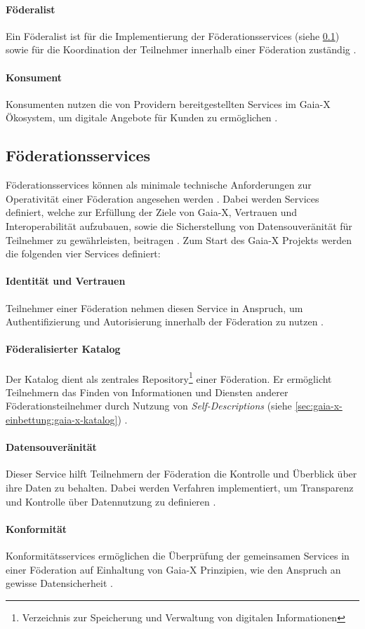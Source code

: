 \paragraph{Föderalist}
Ein Föderalist ist für die Implementierung der Föderationsservices (siehe \ref{subsec:gaia-x:federationservices}) 
sowie für die Koordination der Teilnehmer innerhalb einer Föderation zuständig \cite{GXFS2021}.

\paragraph{Konsument}
Konsumenten nutzen die von Providern bereitgestellten Services im Gaia-X Ökosystem, um digitale Angebote für Kunden zu ermöglichen \cite{GaiaXArchitecture2021}.

\subsection{Föderationsservices}
\label{subsec:gaia-x:federationservices}
Föderationsservices können als minimale technische Anforderungen zur Operativität einer Föderation angesehen werden \cite{GXFS2021}.
Dabei werden Services definiert, welche zur Erfüllung der Ziele von Gaia-X, Vertrauen und Interoperabilität
aufzubauen, sowie die Sicherstellung von Datensouveränität für Teilnehmer zu gewährleisten, beitragen \cite{GXFS2021}.
Zum Start des Gaia-X Projekts werden die folgenden vier Services definiert:

\paragraph{Identität und Vertrauen}
Teilnehmer einer Föderation nehmen diesen Service in Anspruch, um Authentifizierung und Autorisierung innerhalb der Föderation zu nutzen \cite{GXFS2021}.

\paragraph{Föderalisierter Katalog}
Der Katalog dient als zentrales 
Repository\footnote{Verzeichnis zur Speicherung und Verwaltung von digitalen Informationen} 
einer Föderation.
Er ermöglicht Teilnehmern das Finden von Informationen und Diensten anderer Föderationsteilnehmer durch Nutzung von
\emph{Self-Descriptions} (siehe \ref{sec:gaia-x-einbettung:gaia-x-katalog}) \cite{GXFS2021}.

\paragraph{Datensouveränität}
Dieser Service hilft Teilnehmern der Föderation die Kontrolle und Überblick über ihre Daten zu behalten.
Dabei werden Verfahren implementiert, um Transparenz und Kontrolle über Datennutzung zu definieren \cite{GXFS2021}.

\paragraph{Konformität}
Konformitätsservices ermöglichen die Überprüfung der gemeinsamen Services in einer Föderation auf Einhaltung
von Gaia-X Prinzipien, wie den Anspruch an gewisse Datensicherheit \cite{GXFS2021}.
